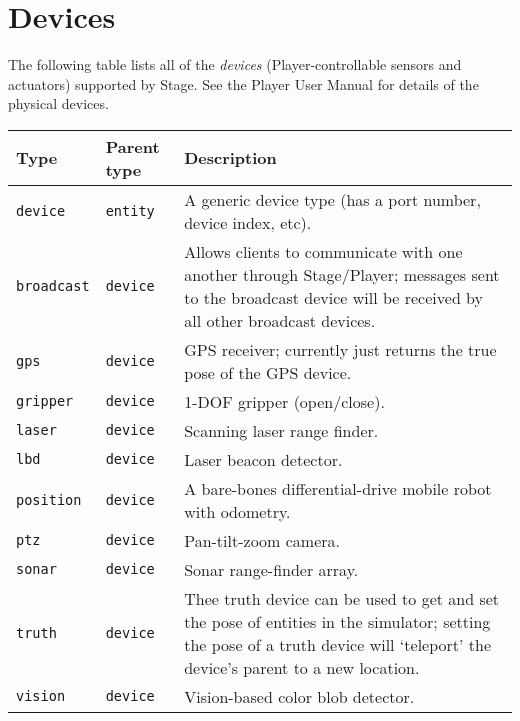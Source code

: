 \documentclass[11pt]{report}
\begin{document}
\section{Devices}
\label{sec.ref.devices}

The following table lists all of the {\em devices}
(Player-controllable sensors and actuators) supported by Stage.  See
the Player User Manual for details of the physical devices.

\noindent
\begin{tabularx}{\columnwidth}{llX}
\hline 
Type & Parent type & Description \\
\hline

\verb'device' & \verb'entity' & A generic device type (has a port
number, device index, etc). \\

\hline

\verb'broadcast' & \verb'device' & Allows clients to communicate with
one another through Stage/Player; messages sent to the broadcast
device will be received by all other broadcast devices.\\

\verb'gps' & \verb'device' & GPS receiver; currently just returns the
true pose of the GPS device.\\

\verb'gripper' & \verb'device' & 1-DOF gripper (open/close).\\

\verb'laser' & \verb'device' & Scanning laser range finder.\\

\verb'lbd' & \verb'device' & Laser beacon detector.\\

\verb'position' & \verb'device' & A bare-bones differential-drive
mobile robot with odometry.\\

\verb'ptz' & \verb'device' & Pan-tilt-zoom camera. \\

\verb'sonar' & \verb'device' & Sonar range-finder array.\\

\verb'truth' & \verb'device' & Thee truth device can be used to get
and set the pose of entities in the simulator; setting the pose of a
truth device will `teleport' the device's parent to a new location.\\

\verb'vision' & \verb'device' & Vision-based color blob detector.\\

\hline
\end{tabularx}
\end{document}
